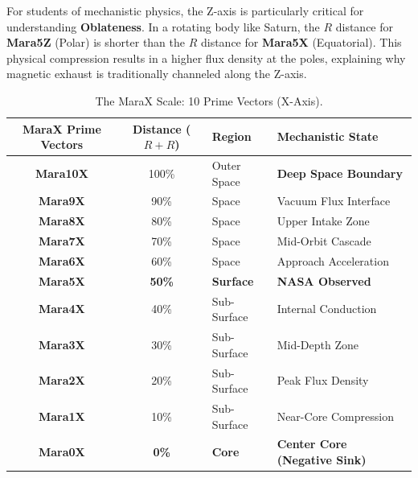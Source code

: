 \documentclass[11pt, a4paper]{article}
\begin{document}
For students of mechanistic physics, the Z-axis is particularly critical for understanding \textbf{Oblateness}. In a rotating body like Saturn, the $R$ distance for \textbf{Mara5Z} (Polar) is shorter than the $R$ distance for \textbf{Mara5X} (Equatorial). This physical compression results in a higher flux density at the poles, explaining why magnetic exhaust is traditionally channeled along the Z-axis.

\begin{table}[!ht]
  \centering
  \begin{tabular}{c c l l} 
    \toprule
    \textbf{MaraX Prime Vectors} & \textbf{Distance ($R+R$)} & \textbf{Region} & \textbf{Mechanistic State} \\
    \midrule
    \textbf{Mara10X} & 100\% & Outer Space & \textbf{Deep Space Boundary} \\
    \textbf{Mara9X} & 90\% & Space & Vacuum Flux Interface \\
    \textbf{Mara8X} & 80\% & Space & Upper Intake Zone \\
    \textbf{Mara7X} & 70\% & Space & Mid-Orbit Cascade \\
    \textbf{Mara6X} & 60\% & Space & Approach Acceleration \\
    \midrule
    \textbf{Mara5X} & \textbf{50\%} & \textbf{Surface} & \textbf{NASA Observed} \\
    \midrule
    \textbf{Mara4X} & 40\% & Sub-Surface & Internal Conduction \\
    \textbf{Mara3X} & 30\% & Sub-Surface & Mid-Depth Zone \\
    \textbf{Mara2X} & 20\% & Sub-Surface & Peak Flux Density \\
    \textbf{Mara1X} & 10\% & Sub-Surface & Near-Core Compression \\
    \textbf{Mara0X} & \textbf{0\%} & \textbf{Core} & \textbf{Center Core (Negative Sink)} \\
    \bottomrule
  \end{tabular}
  \caption{The MaraX Scale: 10 Prime Vectors (X-Axis).}
\end{table}
\end{document}
